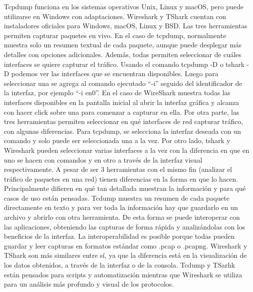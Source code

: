 \documentclass[12pt]{article} %
\begin{document}
Tcpdump funciona en los sistemas operativos Unix, Linux y macOS, pero puede utilizarse en Windows con adaptaciones. Wireshark y TShark cuentan con instaladores oficiales para Windows, macOS, Linux y BSD.
\newline
\newline
Las tres herramientas permiten capturar paquetes en vivo. En el caso de tcpdump, normalmente muestra solo un resumen textual de cada paquete, aunque puede desplegar más detalles con opciones adicionales. Además, todas permiten seleccionar de cuáles interfaces se quiere capturar el tráfico. Usando el comando tcpdump -D o tshark -D podemos ver las interfaces que se encuentran disponibles. Luego para seleccionar una se agrega al comando ejecutado “-i” seguido del identificador de la interfaz, por ejemplo “-i en0”. En el caso de WireShark muestra todas las interfaces disponibles en la pantalla inicial al abrir la interfaz gráfica y alcanza con hacer click sobre una para comenzar a capturar en ella.
\newline
\newline
Por otra parte, las tres herramientas permiten seleccionar en qué interfaces de red capturar tráfico, con algunas diferencias. Para tcpdump, se selecciona la interfaz deseada con un comando y solo puede ser seleccionada una a la vez. Por otro lado, tshark y Wireshark pueden seleccionar varias interfaces a la vez con la diferencia en que en uno se hacen con comandos y en otro a través de la interfaz visual respectivamente.
\newline
\newline
A pesar de ser 3 herramientas con el mismo fin (analizar el tráfico de paquetes en una red) tienen diferencias en la forma en que lo hacen. Principalmente difieren en qué tan detallada muestran la información y para qué casos de uso están pensadas. Tcdump muestra un resumen de cada paquete directamente en texto y para ver toda la información hay que guardarlo en un archivo y abrirlo con otra herramienta. De esta forma se puede interoperar con las aplicaciones, obteniendo las capturas de forma rápida y analizándolas con los beneficios de la interfaz. La interoperabilidad es posible porque todas pueden guardar y leer capturas en formatos estándar como .pcap o .pcapng. Wireshark y TShark son más similares entre sí, ya que la diferencia está en la visualización de los datos obtenidos, a través de la interfaz o de la consola. Tcdump y TSarhk están pensados para scripts y automatización mientras que Wireshark se utiliza para un análisis más profundo y visual de los protocolos. 
\end{document}
